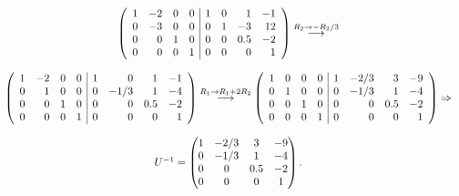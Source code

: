 \documentclass[11pt,letterpaper]{article}
\newcommand{\grstep}[2][\relax]{%
   \ensuremath{\mathrel{
       {\mathop{\longrightarrow}\limits^{#2\mathstrut}_{
                                     \begin{subarray}{l} #1 \end{subarray}}}}}}
\begin{document}
\begin{enumerate}
\begin{equation*}
\begin{array}{c}
\left(\begin{array}{rrrr|rrrr}
 1 & -2 &  0 & 0&1&0&1  &-1\\
 0 & -3 &  0 & 0&0&1&-3 &12\\
 0 &  0 &  1 & 0&0&0&0.5&-2\\
 0 &  0 &  0 & 1&0&0&0&1
\end{array} \right)%
\grstep[]{R_2 \rightarrow -R_2/3}
\\ \\
\left(\begin{array}{rrrr|rrrr}
 1 & -2 &  0 & 0&1&0&1  &-1\\
 0 &  1 &  0 & 0&0&-1/3&1 &-4\\
 0 &  0 &  1 & 0&0&0&0.5&-2\\
 0 &  0 &  0 & 1&0&0&0&1
\end{array} \right)%
\grstep[]{R_1 \rightarrow R_1+2R_2}
%
\left(\begin{array}{rrrr|rrrr}
 1 &  0 &  0 & 0&1&-2/3&3 &-9\\
 0 &  1 &  0 & 0&0&-1/3&1 &-4\\
 0 &  0 &  1 & 0&0&0&0.5&-2\\
 0 &  0 &  0 & 1&0&0&0&1
\end{array} \right) \Rightarrow
\\ \\

U^{-1} =\begin{pmatrix}
1&-2/3&3 &-9\\
0&-1/3&1 &-4\\
0&0&0.5&-2\\
0&0&0&1
\end{pmatrix}.
\end{array}
\end{equation*}


\end{enumerate}
\end{document}
